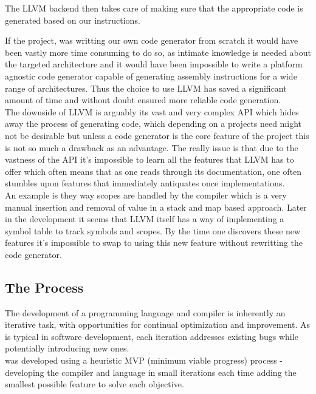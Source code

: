 The LLVM backend then takes care of making sure that the appropriate code is
generated based on our instructions.

If the project, was writting our own code generator from scratch it would have been
vastly more time consuming to do so, as intimate knowledge is needed about the
targeted architecture and it would have been impossible to write a platform agnostic
code generator capable of generating assembly instructions for a wide range of
architectures. Thus the choice to use LLVM has saved a significant amount of time and
without doubt ensured more reliable code generation. \\

The downside of LLVM is arguably its vast and very complex API which hides away the
process of generating code, which depending on a projects need might not be desirable
but unless a code generator is the core feature of the project this is not so much a
drawback as an advantage. The really issue is that due to the vastness of the API
it's impossible to learn all the features that LLVM has to offer which often means
that as one reads through its documentation, one often stumbles upon features that
immediately antiquates once implementations. \\

An example is they way scopes are handled by the \lang{} compiler which is a very
manual insertion and removal of value in a stack and map based approach. Later in the
development it seems that LLVM itself has a way of implementing a symbol table to
track symbols and scopes. By the time one discovers these new features it's
impossible to swap to using this new feature without rewritting the code generator.

\subsection{The Process}

The development of a programming language and compiler is inherently an iterative
task, with opportunities for continual optimization and improvement. As is typical in
software development, each iteration addresses existing bugs while potentially
introducing new ones. \\

\lang{} was developed using a heuristic MVP (minimum viable progress) process -
developing the compiler and language in small iterations each time adding the
smallest possible feature to solve each objective. \\

